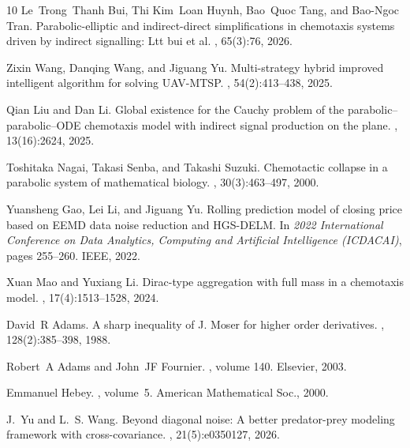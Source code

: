 \documentclass[11pt,reqno]{amsart}
\theoremstyle{definition}
\theoremstyle{remark}
\begin{document}
\begin{thebibliography}{10}
Le~Trong~Thanh Bui, Thi Kim~Loan Huynh, Bao~Quoc Tang, and Bao-Ngoc Tran.
\newblock Parabolic-elliptic and indirect-direct simplifications in chemotaxis systems driven by indirect signalling: Ltt bui et al.
, 65(3):76, 2026.

Zixin Wang, Danqing Wang, and Jiguang Yu.
\newblock Multi-strategy hybrid improved intelligent algorithm for solving {U}{A}{V}-{M}{T}{S}{P}.
, 54(2):413--438, 2025.

Qian Liu and Dan Li.
\newblock Global existence for the {C}auchy problem of the parabolic--parabolic--{O}{D}{E} chemotaxis model with indirect signal production on the plane.
, 13(16):2624, 2025.

Toshitaka Nagai, Takasi Senba, and Takashi Suzuki.
\newblock Chemotactic collapse in a parabolic system of mathematical biology.
, 30(3):463--497, 2000.

Yuansheng Gao, Lei Li, and Jiguang Yu.
\newblock Rolling prediction model of closing price based on {E}{E}{M}{D} data noise reduction and {H}{G}{S}-{D}{E}{L}{M}.
\newblock In {\em 2022 International Conference on Data Analytics, Computing and Artificial Intelligence (ICDACAI)}, pages 255--260. IEEE, 2022.

Xuan Mao and Yuxiang Li.
\newblock Dirac-type aggregation with full mass in a chemotaxis model.
, 17(4):1513--1528, 2024.

David~R Adams.
\newblock A sharp inequality of {J}. {M}oser for higher order derivatives.
, 128(2):385--398, 1988.

Robert~A Adams and John~JF Fournier.
, volume 140.
\newblock Elsevier, 2003.

Emmanuel Hebey.
, volume~5.
\newblock American Mathematical Soc., 2000.

J.~Yu and L.~S. Wang.
\newblock Beyond diagonal noise: {A} better predator-prey modeling framework with cross-covariance.
, 21(5):e0350127, 2026.


\end{thebibliography}
\end{document}
